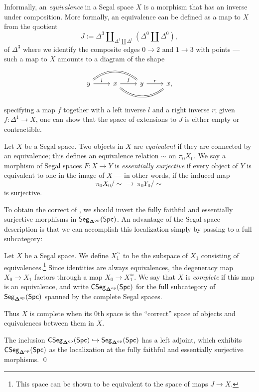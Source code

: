 \documentclass[a4paper,11pt]{article}
\begin{document}
\begin{defn}
  Informally, an \emph{equivalence} in a Segal space $X$ is a morphism
  that has an inverse under composition. More formally, an equivalence can
  be defined as a map to $X$ from the quotient
  \[ J := \Delta^{3} \amalg_{\Delta^{1} \amalg \Delta^{1}}
    (\Delta^{0} \amalg \Delta^{0}),\]
  of $\Delta^{3}$ where
  we identify the composite edges $0 \to 2$ and $1 \to 3$ with points
  --- such a map to $X$ amounts to a diagram of the shape
  \[
    \begin{tikzcd}
      y \ar[rr, bend left=40, equals] \ar[r, "l"] & x \ar[r, "f"]
      \ar[rr, bend right=40, equals] & y \ar[r, "r"] & x,
    \end{tikzcd}
  \]
  specifying a map $f$ together with a left inverse $l$ and a right
  inverse $r$; given $f \colon \Delta^{1} \to X$, one can show that
  the space of extensions to $J$ is either empty or contractible.
\end{defn}

\begin{defn}\label{def:es}
  Let $X$ be a Segal space. Two objects in $X$ are \emph{equivalent}
  if they are connected by an equivalence; this defines an equivalence
  relation $\sim$ on $\pi_{0}X_{0}$. We say a morphism of Segal spaces
  $F \colon X \to Y$ is \emph{essentially surjective} if every object
  of $Y$ is equivalent to one in the image of $X$ --- in other words,
  if the induced map
\[ \pi_{0}X_{0}/\sim \,\to\, \pi_{0}Y_{0}/\sim \]
is surjective.
\end{defn}

To obtain the correct \icat{} of \icats{}, we should invert the fully
faithful and essentially surjective morphisms in
$\textup{\textsf{Seg}}_{\boldsymbol{\Delta}^{\text{\textup{op}}}}(\textup{\textsf{Spc}})$. An advantage of the Segal space description is
that we can accomplish this localization simply by passing to a full
subcategory:
\begin{defn}\label{def:css}
  Let $X$ be a Segal space. We define $X_{1}^{\simeq}$ to be the
  subspace of $X_{1}$ consisting of equivalences.\footnote{This space
    can be shown to be equivalent to the space of maps
    $J \to X$.}  Since identities are always equivalences, the
  degeneracy map $X_{0} \to X_{1}$ factors through a map
  $X_{0} \to X_{1}^{\simeq}$. We say that $X$ is \emph{complete} if
  this map is an equivalence, and write $\textup{\textsf{CSeg}}_{\boldsymbol{\Delta}^{\text{\textup{op}}}}(\textup{\textsf{Spc}})$ for the
  full subcategory of $\textup{\textsf{Seg}}_{\boldsymbol{\Delta}^{\text{\textup{op}}}}(\textup{\textsf{Spc}})$ spanned by the complete
  Segal spaces.
\end{defn}
Thus $X$ is complete when its $0$th space is the ``correct'' space of
objects and equivalences between them in $X$.
\begin{thm}
  The inclusion $\textup{\textsf{CSeg}}_{\boldsymbol{\Delta}^{\text{\textup{op}}}}(\textup{\textsf{Spc}}) \hookrightarrow \textup{\textsf{Seg}}_{\boldsymbol{\Delta}^{\text{\textup{op}}}}(\textup{\textsf{Spc}})$
  has a left adjoint, which exhibits $\textup{\textsf{CSeg}}_{\boldsymbol{\Delta}^{\text{\textup{op}}}}(\textup{\textsf{Spc}})$ as the
  localization at the fully faithful and essentially surjective
  morphisms. \qed
\end{thm}
\end{document}
